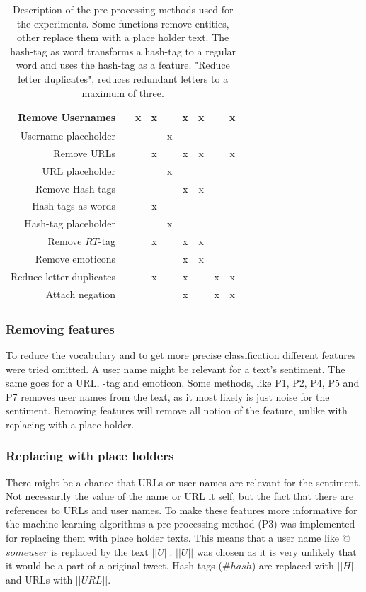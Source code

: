 \begin{table}[!htb]
\begin{tabular}{|r||c|c|c|c|c|c|c|c|}
	 
		Remove Usernames                     & & x & x &   & x & x & & x \\ \hline
		Username placeholder       & &   &   & x &   &   & & \\ \hline
		Remove URLs                          & &   & x &   & x & x & & x \\ \hline
		URL placeholder        & &   &   & x &   &   & & \\ \hline
		Remove Hash-tags                     & &   &   &   & x & x & & \\ \hline
		Hash-tags as words                   & &   & x &   &   &   & & \\ \hline
		Hash-tag placeholder          & &   &   & x &   &   & & \\ \hline
		Remove $RT$-tag                      & &   & x &   & x & x & & \\ \hline
		Remove emoticons                     & &   &   &   & x & x & & \\ \hline
		Reduce letter duplicates             & &   & x &   & x &   & x & x \\ \hline
		Attach negation  & &   &   &   & x &   & x & x \\ \hline
	\end{tabular}
	\caption[Description of used pre-processing methods]{Description of the pre-processing methods used for the experiments. Some functions remove entities, other replace them with a place holder text. The hash-tag as word transforms a hash-tag to a regular word and uses the hash-tag as a feature. "Reduce letter duplicates", reduces redundant letters to a maximum of three.}
	\label{tab:preproc_desc}
\end{table}

\subsubsection{Removing features}
To reduce the vocabulary and to get more precise classification different features were tried omitted. A user name might be relevant for a text's sentiment. The same goes for a URL, -tag and emoticon. Some methods, like P1, P2, P4, P5 and P7 removes user names from the text, as it most likely is just noise for the sentiment. Removing features will remove all notion of the feature, unlike with replacing with a place holder.

\subsubsection{Replacing with place holders}
There might be a chance that URLs or user names are relevant for the sentiment. Not necessarily the value of the name or URL it self, but the fact that there are references to URLs and user names. To make these features more informative for the machine learning algorithms a pre-processing method (P3) was implemented for replacing them with place holder texts. This means that a user name like $@$$someuser$ is replaced by the text $||U||$. $||U||$ was chosen as it is very unlikely that it would be a part of a original tweet. Hash-tags ($\#hash$) are replaced with $||H||$ and URLs with $||URL||$. 

